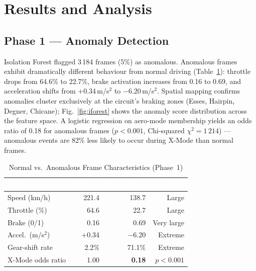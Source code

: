 \documentclass[conference,a4paper]{IEEEtran}
\begin{document}
\section{Results and Analysis}
\label{sec:results}

\subsection{Phase 1 — Anomaly Detection}

Isolation Forest flagged 3\,184 frames (5\%) as anomalous.
Anomalous frames exhibit dramatically different behaviour from normal driving
(Table~\ref{tab:anomaly}): throttle drops from 64.6\% to 22.7\%, brake activation
increases from 0.16 to 0.69, and acceleration shifts from $+$0.34\,m/s$^2$ to
$-$6.20\,m/s$^2$.
Spatial mapping confirms anomalies cluster exclusively at the circuit's braking zones
(Esses, Hairpin, Degner, Chicane); Fig.~\ref{fig:iforest} shows the anomaly score
distribution across the feature space.
A logistic regression on aero-mode membership yields an odds ratio of 0.18 for anomalous frames
($p < 0.001$, Chi-squared $\chi^2 = 1\,214$) — anomalous events are 82\% less likely to
occur during X-Mode than normal frames.

\begin{table}[h]
\caption{Normal vs.\ Anomalous Frame Characteristics (Phase~1)}
\label{tab:anomaly}
\centering
\small
\renewcommand{\arraystretch}{1.25}
\begin{tabular}{lrrr}
\toprule
\rowcolor{hdrgreen}
\textcolor{white}{\textbf{Feature}} &
\textcolor{white}{\textbf{Normal}} &
\textcolor{white}{\textbf{Anomalous}} &
\textcolor{white}{\textbf{Effect}} \\
\midrule
Speed (km/h)        & 221.4 & 138.7  & Large \\
Throttle (\%)       & 64.6  & 22.7   & Large \\
Brake (0/1)         & 0.16  & 0.69   & Very large \\
Accel.\ (m/s$^2$)  & $+$0.34 & $-$6.20 & Extreme \\
Gear-shift rate     & 2.2\% & 71.1\% & Extreme \\
X-Mode odds ratio   & 1.00  & \textbf{0.18}  & $p{<}0.001$ \\
\bottomrule
\end{tabular}
\end{table}
\end{document}
